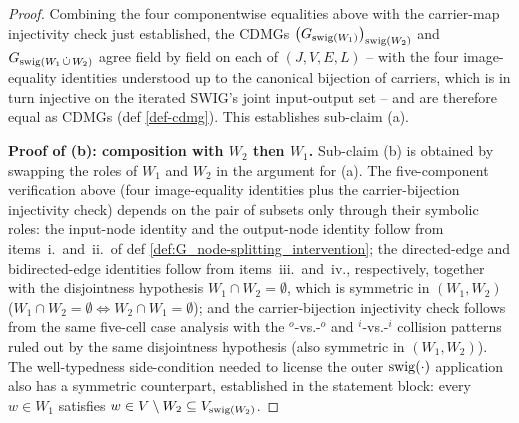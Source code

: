 \documentclass[main]{subfiles}
\begin{document}
\begin{proof}
\smallskip
Combining the four componentwise equalities above with the carrier-map injectivity check just established, the CDMGs $\left ( G_{\mathrm{swig}(W_1)} \right )_{\mathrm{swig}(W_2)}$ and $G_{\mathrm{swig}(W_1 \,\dot{\cup}\, W_2)}$ agree field by field on each of $(J, V, E, L)$ -- with the four image-equality identities understood up to the canonical bijection of carriers, which is in turn injective on the iterated SWIG's joint input-output set -- and are therefore equal as CDMGs (def \ref{def-cdmg}). This establishes sub-claim (a).

\medskip\noindent\textbf{Proof of (b): composition with $W_2$ then $W_1$.}
Sub-claim (b) is obtained by swapping the roles of $W_1$ and $W_2$ in the argument for (a). The five-component verification above (four image-equality identities plus the carrier-bijection injectivity check) depends on the pair of subsets only through their symbolic roles: the input-node identity and the output-node identity follow from items~i.\ and~ii.\ of def \ref{def:G_node-splitting_intervention}; the directed-edge and bidirected-edge identities follow from items~iii.\ and~iv., respectively, together with the disjointness hypothesis $W_1 \cap W_2 = \emptyset$, which is symmetric in $(W_1, W_2)$ ($W_1 \cap W_2 = \emptyset \Leftrightarrow W_2 \cap W_1 = \emptyset$); and the carrier-bijection injectivity check follows from the same five-cell case analysis with the $^o$-vs.-$^o$ and $^i$-vs.-$^i$ collision patterns ruled out by the same disjointness hypothesis (also symmetric in $(W_1, W_2)$). The well-typedness side-condition needed to license the outer $\mathrm{swig}(\cdot)$ application also has a symmetric counterpart, established in the statement block: every $w \in W_1$ satisfies $w \in V \setminus W_2 \subseteq V_{\mathrm{swig}(W_2)}$.


\end{proof}
\end{document}
